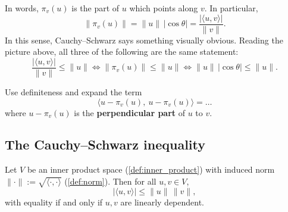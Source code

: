 \begin{center}
\end{center}

In words, $\pi_v(u)$ is the part of $u$ which points along $v$. In particular,
\[
\|\pi_v(u)\| = \|u\|\,|\cos\theta| = \frac{|\langle u,v\rangle|}{\|v\|}.
\]
In this sense, Cauchy--Schwarz says something visually obvious. Reading the picture above, all
three of the following are the same statement:
\[
\frac{|\langle u,v\rangle|}{\|v\|} \leq \|u\| \iff \|\pi_v(u)\| \leq \|u\| \iff \|u\|\,|\cos\theta| \leq \|u\|.
\]

\begin{remark}
\label{rem:proof_hint_cauchy_schwarz}
Use definiteness and expand the term
\[
\langle u - \pi_v(u),\ u - \pi_v(u)\rangle = \dots
\]
where $u - \pi_v(u)$ is the \textbf{perpendicular part} of $u$ to $v$.
\end{remark}

\subsection{The Cauchy--Schwarz inequality}


\begin{theorem}
\label{thm:cauchy_schwarz}
Let $V$ be an inner product space (\cref{def:inner_product}) with induced norm
$\|\cdot\| := \sqrt{\langle\cdot,\cdot\rangle}$ (\cref{def:norm}). Then for all $u,v \in V$,
\[|\langle u,v\rangle| \leq \|u\|\,\|v\|,\]
with equality if and only if $u,v$ are linearly dependent.
\end{theorem}

